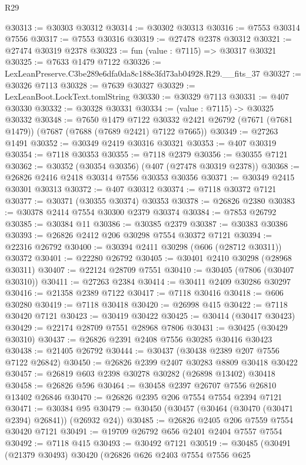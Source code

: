 \begin{lexlean}{R29}
\begin{coremodule}
@30313 := @30303 @30312
@30314 := @30302 @30313
@30316 := @7553 @30314 @7556
@30317 := @7553 @30316
@30319 := @27478 @2378 @30312
@30321 := @27474 @30319 @2378
@30323 := fun (value : @7115) => @30317 @30321
@30325 := @7633 @1479 @7122
@30326 := LexLeanPreserve.C3be289e6dfa0da8c188e3fd73ab04928.R29.__fits_37
@30327 := @30326 @7113
@30328 := @7639 @30327
@30329 := LexLeanBoot.LockText.tomlString
@30330 := @30329 @7113
@30331 := @407 @30330
@30332 := @30328 @30331
@30334 := (value : @7115) -> @30325 @30332
@30348 := @7650
    @1479
    @7122
    @30332
    @2421
    @26792
    (@7671 (@7681 @1479))
    (@7687 (@7688 (@7689 @2421) @7122 @7665))
@30349 := @27263 @1491
@30352 := @30349 @2419 @30316 @30321
@30353 := @407 @30319
@30354 := @7118 @30353
@30355 := @7118 @2379
@30356 := @30355 @7121
@30362 := @30352 (@30354 @30356) (@407 (@27478 @30319 @2378))
@30368 := @26826 @2416 @2418 @30314 @7556 @30353 @30356
@30371 := @30349 @2415 @30301 @30313
@30372 := @407 @30312
@30374 := @7118 @30372 @7121
@30377 := @30371 (@30355 @30374) @30353
@30378 := @26826 @2380
@30383 := @30378 @2414 @7554 @30300 @2379 @30374
@30384 := @7853 @26792
@30385 := @30384 @11
@30386 := @30385 @2379
@30387 := @30383 @30386
@30393 := @26826 @2412 @206 @30298 @7554 @30372 @7121
@30394 := @22316 @26792
@30400 := @30394 @2411 @30298 (@606 (@28712 @30311)) @30372
@30401 := @22280 @26792
@30405 := @30401 @2410 @30298 (@28968 @30311)
@30407 := @22124 @28709 @7551
@30410 := @30405 (@7806 (@30407 @30310))
@30411 := @27263 @2384
@30414 := @30411 @2409 @30286 @30297
@30416 := @21358 @2389 @7122
@30417 := @7118 @30416
@30418 := @606 @30280
@30419 := @7118 @30418
@30420 := @26998 @415
@30422 := @7118 @30420 @7121
@30423 := @30419 @30422
@30425 := @30414 (@30417 @30423)
@30429 := @22174 @28709 @7551 @28968 @7806
@30431 := @30425 (@30429 @30310)
@30437 := @26826 @2391 @2408 @7556 @30285 @30416 @30423
@30438 := @21405 @26792
@30444 := @30437 (@30438 @2389 @207 @7556 @7122 @26842)
@30450 := @26826 @2399 @2407 @30283 @8809 @30418 @30422
@30457 := @26819 @603 @2398 @30278 @30282 (@26898 @13402) @30418
@30458 := @26826 @596
@30464 := @30458 @2397 @26707 @7556 @26810 @13402 @26846
@30470 := @26826 @2395 @206 @7554 @7554 @2394 @7121
@30471 := @30384 @95
@30479 := @30450 (@30457 (@30464 (@30470 (@30471 @2394) @26841)) (@26932 @24))
@30485 := @26826 @2405 @206 @7559 @7554 @30420 @7121
@30491 := @19709 @26792 @656 @2401 @2404 @7557 @7554
@30492 := @7118 @415
@30493 := @30492 @7121
@30519 := @30485
    (@30491
      (@21379 @30493)
      @30420
      (@26826
        @626
        @2403
        @7554
        @7556
        @625

\end{coremodule}
\end{lexlean}

